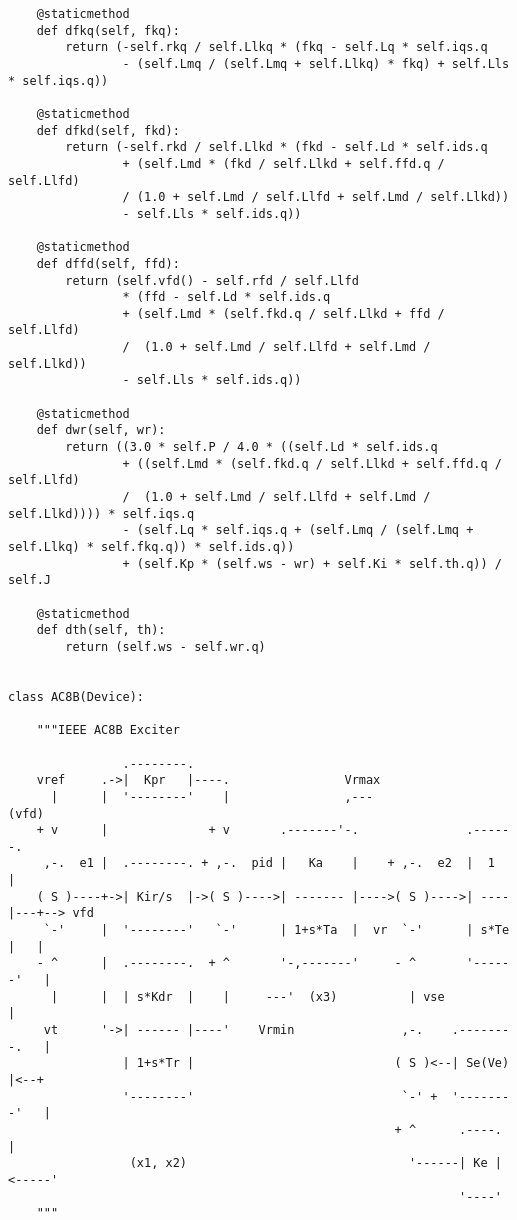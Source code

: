 \begin{lstlisting}
    @staticmethod
    def dfkq(self, fkq):
        return (-self.rkq / self.Llkq * (fkq - self.Lq * self.iqs.q
                - (self.Lmq / (self.Lmq + self.Llkq) * fkq) + self.Lls * self.iqs.q))

    @staticmethod
    def dfkd(self, fkd):
        return (-self.rkd / self.Llkd * (fkd - self.Ld * self.ids.q
                + (self.Lmd * (fkd / self.Llkd + self.ffd.q / self.Llfd)
                / (1.0 + self.Lmd / self.Llfd + self.Lmd / self.Llkd))
                - self.Lls * self.ids.q))

    @staticmethod
    def dffd(self, ffd):
        return (self.vfd() - self.rfd / self.Llfd
                * (ffd - self.Ld * self.ids.q
                + (self.Lmd * (self.fkd.q / self.Llkd + ffd / self.Llfd)
                /  (1.0 + self.Lmd / self.Llfd + self.Lmd / self.Llkd))
                - self.Lls * self.ids.q))

    @staticmethod
    def dwr(self, wr):
        return ((3.0 * self.P / 4.0 * ((self.Ld * self.ids.q
                + ((self.Lmd * (self.fkd.q / self.Llkd + self.ffd.q / self.Llfd)
                /  (1.0 + self.Lmd / self.Llfd + self.Lmd / self.Llkd)))) * self.iqs.q
                - (self.Lq * self.iqs.q + (self.Lmq / (self.Lmq + self.Llkq) * self.fkq.q)) * self.ids.q))
                + (self.Kp * (self.ws - wr) + self.Ki * self.th.q)) / self.J

    @staticmethod
    def dth(self, th):
        return (self.ws - self.wr.q)


class AC8B(Device):

    """IEEE AC8B Exciter

                .--------.
    vref     .->|  Kpr   |----.                Vrmax
      |      |  '--------'    |                ,---               (vfd)
    + v      |              + v       .-------'-.               .------.
     ,-.  e1 |  .--------. + ,-.  pid |   Ka    |    + ,-.  e2  |  1   |
    ( S )----+->| Kir/s  |->( S )---->| ------- |---->( S )---->| ---- |---+--> vfd
     `-'     |  '--------'   `-'      | 1+s*Ta  |  vr  `-'      | s*Te |   |
    - ^      |  .--------.  + ^       '-,-------'     - ^       '------'   |
      |      |  | s*Kdr  |    |     ---'  (x3)          | vse              |
     vt      '->| ------ |----'    Vrmin               ,-.    .--------.   |
                | 1+s*Tr |                            ( S )<--| Se(Ve) |<--+
                '--------'                             `-' +  '--------'   |
                                                      + ^      .----.      |
                 (x1, x2)                               '------| Ke |<-----'
                                                               '----'
    """


\end{lstlisting}
